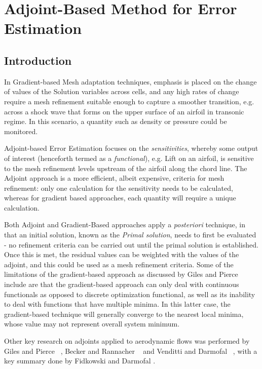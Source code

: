 \section{Adjoint-Based Method for Error Estimation}
\label{section:Adjoint}
\subsection{Introduction}

In Gradient-based Mesh adaptation techniques, emphasis is placed on the change of values of the Solution variables across cells, and any high rates of change require a mesh refinement suitable enough to capture a smoother transition, e.g. across a shock wave that forms on the upper surface of an airfoil in transonic regime. In this scenario, a quantity such as density or pressure could be monitored.\par
Adjoint-based Error Estimation focuses on the \textit{sensitivities}, whereby some output of interest (henceforth termed as a \textit{functional}), e.g. Lift on an airfoil, is sensitive to the mesh refinement levels upstream of the airfoil along the chord line. The Adjoint approach is a more efficient, albeit expensive, criteria for mesh refinement: only one calculation for the sensitivity needs to be calculated, whereas for gradient based approaches, each quantity will require a unique calculation.\par
Both Adjoint and Gradient-Based approaches apply a \textit{posteriori} technique, in that an initial solution, known as the \textit{Primal solution}, needs to first be evaluated - no refinement criteria can be carried out until the primal solution is established. Once this is met, the residual values can be weighted with the values of the adjoint, and this could be used as a mesh refinement criteria. Some of the limitations of the gradient-based approach as discussed by Giles and Pierce \cite{Giles:2000} include are that the gradient-based approach can only deal with continuous functionals as opposed to discrete optimization functional, as well as its inability to deal with functions that have multiple minima. In this latter case, the gradient-based technique will generally converge to the nearest local minima, whose value may not represent overall system minimum.\par 
Other key research on adjoints applied to aerodynamic flows was performed by Giles and Pierce ~\cite{Giles:2000}, Becker and Rannacher ~\cite{Becker:2001} and Venditti and Darmofal ~\cite{Venditti:2001}, with a key summary done by Fidkowski and Darmofal \cite{Fidkowski:2011}.


